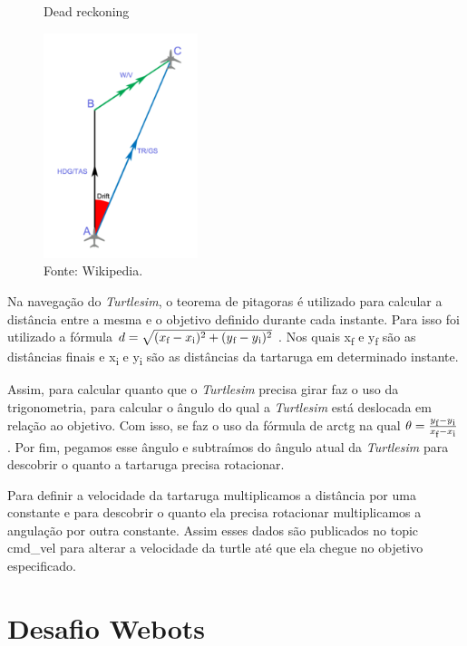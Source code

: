 
\begin{figure}[h!]
    \centering
    \caption{Dead reckoning}
    \includegraphics[width=0.4\textwidth]{Figures/dead_reck.png}
    \caption*{Fonte: Wikipedia.}
    \label{fig:Dead reckoning}
\end{figure}

Na navegação do \textit{Turtlesim}, o teorema de pitagoras é utilizado para calcular
a distância entre a mesma e o objetivo definido durante cada instante. Para isso foi utilizado a fórmula 
    $d = \sqrt{(x\textsubscript{f} - x\textsubscript{i})^2 + (y\textsubscript{f} - y\textsubscript{i})^2}$
. Nos quais x\textsubscript{f} e y\textsubscript{f} são as distâncias finais e x\textsubscript{i} e y\textsubscript{i} são as distâncias da tartaruga em determinado instante.

Assim, para calcular quanto que o \textit{Turtlesim} precisa girar faz o uso da trigonometria, para calcular o ângulo do qual a \textit{Turtlesim} está deslocada  em relação ao objetivo. Com isso, se faz o uso da fórmula de arctg na qual 
$\theta = \frac{y\textsubscript{f} - y\textsubscript{i}}{x\textsubscript{f} - x\textsubscript{i}} $
. Por fim, pegamos esse ângulo e subtraímos do ângulo atual da \textit{Turtlesim} para descobrir o quanto a tartaruga precisa rotacionar.

Para definir a velocidade da tartaruga multiplicamos a distância por uma constante e para descobrir o quanto ela precisa rotacionar multiplicamos a 
angulação por outra constante. Assim esses dados são publicados no topic
cmd\_vel para alterar a velocidade da turtle até que ela chegue no objetivo
especificado.

\section{Desafio Webots}

